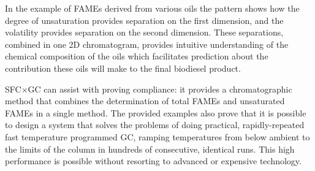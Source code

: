 In the example of FAMEs derived from various oils the pattern shows
how the degree of unsaturation provides separation on the first dimension, and
the volatility provides separation on the second dimension. These separations,
combined in one 2D chromatogram, provides intuitive understanding of the
chemical composition of the oils which facilitates prediction about the
contribution these oils will make to the final biodiesel product.

SFC×GC can assist with proving compliance: it provides a chromatographic method that
combines the determination of total FAMEs and unsaturated FAMEs in a single
method. The provided examples also prove that it is possible to design a system that
solves the problems of doing practical, rapidly-repeated fast temperature
programmed GC, ramping temperatures from below ambient to the limits of the
column in hundreds of consecutive, identical runs. This high performance is
possible without resorting to advanced or expensive technology.
